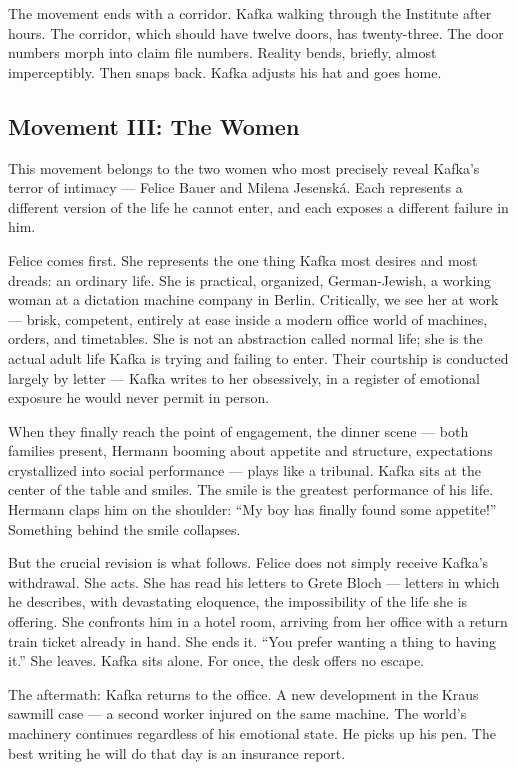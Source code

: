 The movement ends with a corridor. Kafka walking through the Institute after hours. The corridor, which should have twelve doors, has twenty-three. The door numbers morph into claim file numbers. Reality bends, briefly, almost imperceptibly. Then snaps back. Kafka adjusts his hat and goes home.

\subsection{Movement III: The Women}

This movement belongs to the two women who most precisely reveal Kafka's terror of intimacy --- Felice Bauer and Milena Jesenská. Each represents a different version of the life he cannot enter, and each exposes a different failure in him.

Felice comes first. She represents the one thing Kafka most desires and most dreads: an ordinary life. She is practical, organized, German-Jewish, a working woman at a dictation machine company in Berlin. Critically, we see her at work --- brisk, competent, entirely at ease inside a modern office world of machines, orders, and timetables. She is not an abstraction called normal life; she is the actual adult life Kafka is trying and failing to enter. Their courtship is conducted largely by letter --- Kafka writes to her obsessively, in a register of emotional exposure he would never permit in person.

When they finally reach the point of engagement, the dinner scene --- both families present, Hermann booming about appetite and structure, expectations crystallized into social performance --- plays like a tribunal. Kafka sits at the center of the table and smiles. The smile is the greatest performance of his life. Hermann claps him on the shoulder: ``My boy has finally found some appetite!'' Something behind the smile collapses.

But the crucial revision is what follows. Felice does not simply receive Kafka's withdrawal. She acts. She has read his letters to Grete Bloch --- letters in which he describes, with devastating eloquence, the impossibility of the life she is offering. She confronts him in a hotel room, arriving from her office with a return train ticket already in hand. She ends it. ``You prefer wanting a thing to having it.'' She leaves. Kafka sits alone. For once, the desk offers no escape.

The aftermath: Kafka returns to the office. A new development in the Kraus sawmill case --- a second worker injured on the same machine. The world's machinery continues regardless of his emotional state. He picks up his pen. The best writing he will do that day is an insurance report.

